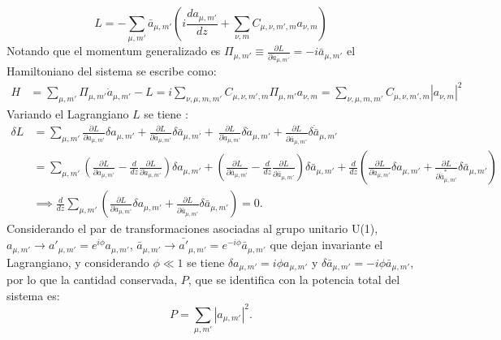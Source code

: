 \begin{equation}
	L = -\sum_{\mu, m'} \bar{a}_{\mu, m'}\left( i \frac{ d a_{\mu, m'}}{dz}   +
\sum_{\nu, m} C_{\mu, \nu, m', m}  a_{\nu, m}\right)
\end{equation}
Notando que el momentum generalizado es $\Pi_{\mu, m'} \equiv \frac{\partial L}{\partial \dot{a}_{\mu, m'}} = -i\bar{a}_{\mu, m'}$ el Hamiltoniano del sistema se escribe como:
\begin{align}
	H &= \sum_{\mu, m'} \Pi_{\mu, m'} \dot{{a}}_{\mu, m'} - L = i\sum_{\nu, \mu, m, m'} C_{\mu, \nu, m', m} \Pi_{\mu, m'} a_{\nu, m} = \sum_{\nu, \mu, m, m'} C_{\mu, \nu, m', m} |a_{\nu, m}|^2 \label{eqn:hamiltoniano}
\end{align}
Variando el Lagrangiano $L$ se tiene \cite{NHsymmetries}:
\begin{align*}
	\delta L &= \sum_{\mu, m'} \frac{\partial L}{\partial a_{\mu, m'}} \delta a_{\mu, m'} +  \frac{\partial L}{\partial \bar{a}_{\mu, m'}} \delta \bar{a}_{\mu, m'} + \ \frac{\partial L}{\partial \dot{a}_{\mu, m'}} \delta \dot{a}_{\mu, m'} + \frac{\partial L}{\partial \dot{\bar{a}}_{\mu, m'}} \delta \dot{\bar{a}}_{\mu, m'}
	\\
	&= \sum_{\mu, m'} \left( \frac{\partial L}{\partial a_{\mu, m'}} - \frac{d}{dz}\frac{\partial L}{\partial \dot{a}_{\mu, m'}} \right)\delta a_{\mu, m'} + \left( \frac{\partial L}{\partial\bar{a}_{\mu, m'}} - \frac{d}{dz}\frac{\partial L}{\partial  \dot{\bar{a}}_{\mu, m'}} \right)\delta \bar{a}_{\mu, m'} + \frac{d}{dz}\left(\frac{\partial L}{\partial \dot{a}_{\mu, m'}}\delta a_{\mu, m'} +  \frac{\partial L}{\partial \dot{\bar{a}}^*_{\mu, m'}}\delta \bar{a}_{\mu, m'}\right)
	\\	
	&\implies  \frac{d}{dz} \sum_{\mu, m'}\left(\frac{\partial L}{\partial \dot{a}_{\mu, m'}}\delta a_{\mu, m'} +  \frac{\partial L}{\partial \dot{\bar{a}}_{\mu, m'}}\delta \bar{a}_{\mu, m'}\right) = 0.
\end{align*}
Considerando el par de transformaciones asociadas al grupo unitario U(1), $a_{\mu, m'}\to a'_{\mu, m'} = e^{i\phi}a_{\mu, m'}$, $\bar{a}_{\mu, m'}\to \bar{a'}_{\mu, m'} = e^{-i\phi}\bar{a}_{\mu, m'}$ que dejan invariante el Lagrangiano, y considerando $\phi \ll 1$ se tiene $\delta a_{\mu, m'} = i\phi a_{\mu, m'}$ y $\delta \bar{a}_{\mu, m'} = -i\phi \bar{a}_{\mu, m'}$, por lo que la cantidad conservada, $P$, que se identifica con la potencia total del sistema es:
\begin{equation}
	P = \sum_{\mu, m'} |a_{\mu, m'}|^2. \label{eqn:power}
\end{equation}

